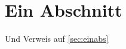 \documentclass{scrartcl}
\begin{document}
\section{Ein Abschnitt}
\label{sec:ein-abs}
Und Verweis auf \ref{sec:einabs}
\end{document}
